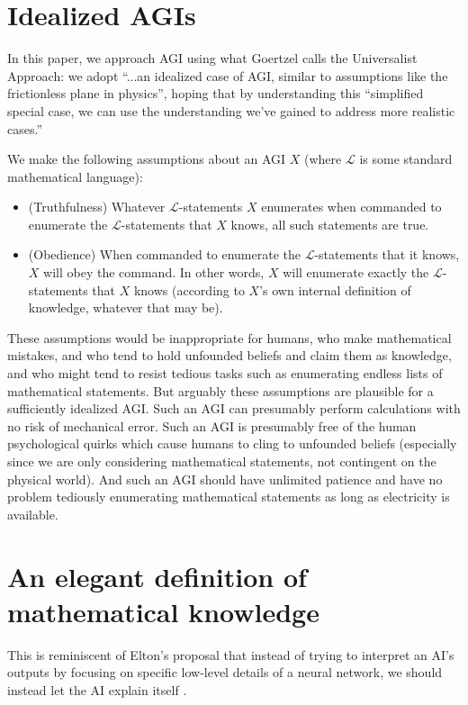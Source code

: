 \documentclass[runningheads]{llncs}
\begin{document}
\section{Idealized AGIs}

In this paper, we approach AGI using what
Goertzel \cite{goertzel2014artificial} calls
the Universalist Approach:
we adopt ``...an idealized case of AGI, similar to
assumptions like the frictionless plane in physics'', hoping that by
understanding this ``simplified special
case, we can use the understanding we've gained to address more realistic
cases.''

We make the following assumptions about an AGI $X$ (where $\mathscr L$ is some
standard mathematical language):
\begin{itemize}
  \item (Truthfulness) Whatever $\mathscr L$-statements $X$ enumerates
  when commanded to enumerate the $\mathscr L$-statements that $X$ knows,
  all such statements are true.
  \item (Obedience) When commanded to enumerate the $\mathscr L$-statements that it knows,
  $X$ will obey the command. In other words, $X$ will enumerate exactly the
  $\mathscr L$-statements that $X$ knows (according to $X$'s own internal definition
  of knowledge, whatever that may be).
\end{itemize}

These assumptions would be inappropriate for humans, who make mathematical
mistakes, and who tend to hold unfounded beliefs and claim them as knowledge,
and who might tend to resist tedious tasks such as enumerating endless lists of
mathematical statements. But arguably these assumptions are plausible for a
sufficiently idealized AGI. Such an AGI can presumably perform calculations with
no risk of mechanical error. Such an AGI is presumably free of the human
psychological quirks which cause humans to cling to unfounded beliefs (especially
since we are only considering mathematical statements, not contingent on
the physical world). And such an AGI should have unlimited patience and have no
problem tediously enumerating mathematical statements as long as electricity is
available.



\section{An elegant definition of mathematical knowledge}

This is reminiscent of Elton's proposal that instead of trying to
interpret an AI's outputs by focusing on specific low-level details
of a neural network, we should instead let the AI explain itself
\cite{elton}.




\end{document}
